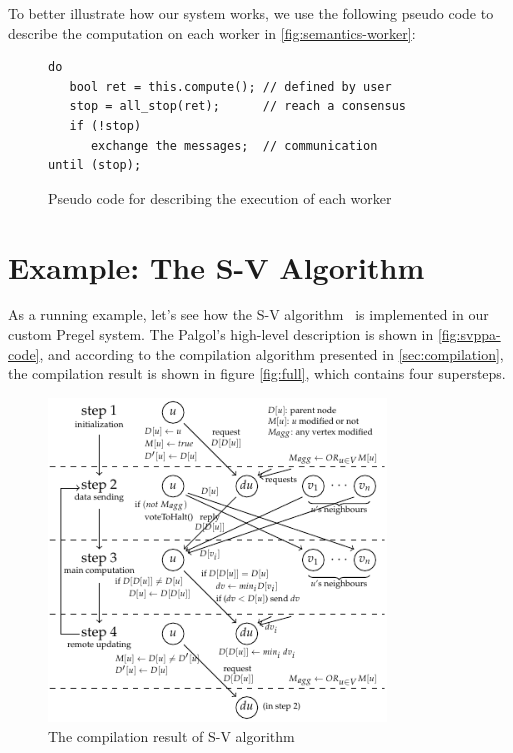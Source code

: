 \documentclass{sokendai_thesis} %
\begin{document}
To better illustrate how our system works, we use the following pseudo code to describe the computation on each worker in \autoref{fig:semantics-worker}:

\begin{figure}[ht]
\centering
\vspace{-2ex}
\begin{lstlisting}[basicstyle=\small\ttfamily,numbers=none,xleftmargin=0.1\textwidth]
do
   bool ret = this.compute(); // defined by user
   stop = all_stop(ret);      // reach a consensus
   if (!stop)
      exchange the messages;  // communication
until (stop);
\end{lstlisting}
\vspace{-2ex}
\caption{Pseudo code for describing the execution of each worker}
\label{fig:semantics-worker}
\end{figure}

\section{Example: The S-V Algorithm}

As a running example, let's see how the S-V algorithm~\cite{connectivity} is implemented in our custom Pregel system.
The Palgol's high-level description is shown in \autoref{fig:svppa-code}, and according to the compilation algorithm presented in \autoref{sec:compilation}, the compilation result is shown in figure \autoref{fig:full}, which contains four supersteps.

\begin{figure}[ht]
 \centering
 \includegraphics[width=0.8\textwidth]{figures/svppa.pdf}
 \caption{The compilation result of S-V algorithm}
 \label{fig:full}
\end{figure}
\end{document}
